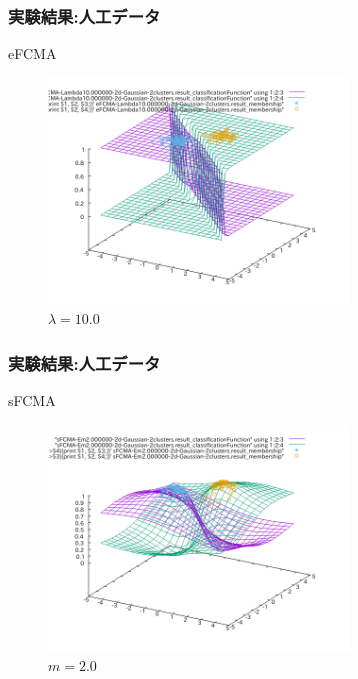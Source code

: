 \documentclass[13pt,dvipdfmx]{beamer}
\begin{document}
\begin{frame}\frametitle{実験結果:人工データ}
  \begin{block}{eFCMA}
   \begin{figure}[htbp]
    \begin{center}
    \includegraphics[height=60mm]{eFCMA-Lambda10.png}
   \end{center}
   \captionsetup{labelformat=empty,labelsep=none}
   \caption{$\lambda=10.0$}
  \end{figure}
 \end{block}
\end{frame}

\begin{frame}\frametitle{実験結果:人工データ}
  \begin{block}{sFCMA}
   \begin{figure}[htbp]
    \begin{center}
    \includegraphics[height=60mm]{sFCMA-Em2.png}
   \end{center}
    \captionsetup{labelformat=empty,labelsep=none}
   \caption{$m=2.0$}
  \end{figure}
 \end{block}
\end{frame}
\end{document}
